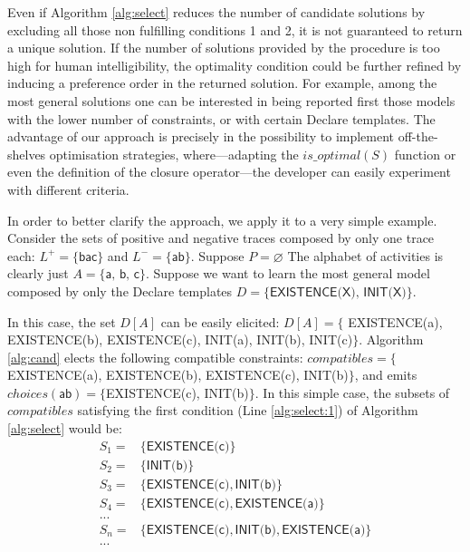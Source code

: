 Even if Algorithm \ref{alg:select} reduces the number of candidate solutions by excluding all those non fulfilling conditions 1 and 2, it is not guaranteed to return a unique solution. If the number of solutions provided by the procedure is too high for human intelligibility, the optimality condition could be further refined by inducing a preference order in the returned solution. For example, among the most general solutions one can be interested in being reported first those models with the lower number of constraints, or with certain Declare templates. The advantage of our approach is precisely in the possibility to implement off-the-shelves optimisation strategies, where---adapting the $is\_optimal(S)$ function or even the definition of the closure operator---the developer can easily experiment with different criteria.

In order to better clarify the approach, we apply it to a very simple example.  
Consider the sets of positive and negative traces composed by only one trace each: $L^+=\{\textsf{bac}\}$ and $L^-=\{\textsf{ab}\}$. Suppose $P=\varnothing$ The alphabet of activities is clearly just $A=\{\textsf{a, b, c}\}$. Suppose we want to learn the most general model composed by only the Declare templates $D=\{\textsf{EXISTENCE(X), INIT(X)}\}$.%

In this case, the set $D[A]$ can be easily elicited: $D[A]=\{$ \textsf{EXISTENCE(a), EXISTENCE(b), EXISTENCE(c), INIT(a), INIT(b), INIT(c)}$\}$. Algorithm \ref{alg:cand} elects the following compatible constraints: ${compatibles}=\{$\textsf{EXISTENCE(a), EXISTENCE(b), EXISTENCE(c), INIT(b)}$\}$, and emits ${choices}(\textsf{ab})=\{$\textsf{EXISTENCE(c), INIT(b)}$\}$.
%
%
In this simple case, the subsets of ${compatibles}$ satisfying the first condition (Line \ref{alg:select:1}) of Algorithm \ref{alg:select} would be: 
\[
\begin{array}{cl}
 S_1= &  \{\textsf{EXISTENCE(c)}\}  \\
 S_2= &  \{\textsf{INIT(b)}\}   \\
 S_3= &  \{\textsf{EXISTENCE(c)}, \textsf{INIT(b)}\} \\
 S_4= & \{\textsf{EXISTENCE(c)}, \textsf{EXISTENCE(a)}\} \\
  ... & \\
 S_n= & \{\textsf{EXISTENCE(c)}, \textsf{INIT(b)}, \textsf{EXISTENCE(a)}\} \\
 ... &
\end{array}
\]

